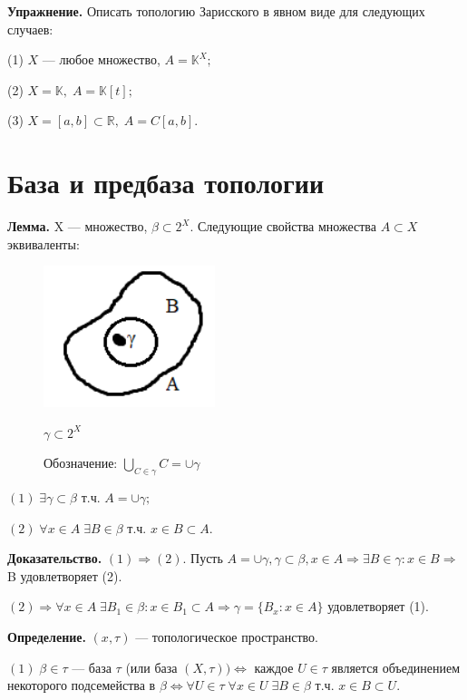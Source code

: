 \documentclass[12pt,a4paper]{article}
\begin{document}
\textbf{Упражнение.} Описать топологию Зарисского в явном виде для следующих случаев:

(1) $X$ --- любое множество, $A = \mathbb{K}^X;$

(2) $X = \mathbb{K}, \; A = \mathbb{K}[t];$

(3) $X = [a, b] \subset \mathbb{R}, \; A = C[a,b].$

\section{База и предбаза топологии}

\textbf{Лемма.} X --- множество, $\beta \subset 2^{X}.$ Следующие свойства множества $A \subset X$ эквиваленты: 

\begin{figure}
	
	\includegraphics[width = 5cm]{lect3_1.png}
	
	$\gamma \subset 2^X$
	
	Обозначение: $\bigcup_{C \in \gamma} C = \cup \gamma$
\end{figure}

$(1) \; \exists \gamma \subset \beta$ т.ч. $A = \cup \gamma;$

$(2) \; \forall x \in A \; \exists B \in \beta$ т.ч. $x \in B \subset A.$ 

\textbf{Доказательство.} $(1) \Rightarrow (2).$ Пусть $A = \cup \gamma, \gamma \subset \beta, x \in A \Rightarrow \exists B \in \gamma: x \in B \Rightarrow$ B удовлетворяет (2). 

$(2) \Rightarrow \forall x \in A \; \exists B_{1} \in \beta: x \in B_{1} \subset A \Rightarrow \gamma = \{B_{x}: x \in A\}$ удовлетворяет (1). 

\textbf{Определение.} $(x, \tau)$ --- топологическое пространство. 

$(1) \; \beta \in \tau$ --- база $\tau$ (или база $(X, \tau)) \Leftrightarrow$ каждое $U \in \tau$ является объединением некоторого подсемейства в $\beta \Leftrightarrow \forall U \in \tau \; \forall x \in U \; \exists B \in \beta$ т.ч. $x \in B \subset U.$ 
\end{document}
